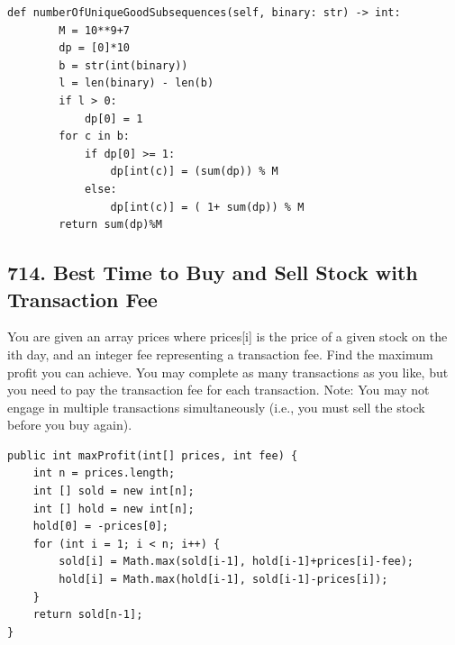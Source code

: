 \documentclass[9pt, b5paaper]{book}
\begin{document}
\begin{verbatim}
def numberOfUniqueGoodSubsequences(self, binary: str) -> int:
        M = 10**9+7
        dp = [0]*10
        b = str(int(binary))
        l = len(binary) - len(b)
        if l > 0:
            dp[0] = 1
        for c in b:
            if dp[0] >= 1:
                dp[int(c)] = (sum(dp)) % M
            else:
                dp[int(c)] = ( 1+ sum(dp)) % M
        return sum(dp)%M
\end{verbatim}
\subsection{714. Best Time to Buy and Sell Stock with Transaction Fee}
\label{sec-1-4-21}
You are given an array prices where prices[i] is the price of a given stock on the ith day, and an integer fee representing a transaction fee.
Find the maximum profit you can achieve. You may complete as many transactions as you like, but you need to pay the transaction fee for each transaction.
Note: You may not engage in multiple transactions simultaneously (i.e., you must sell the stock before you buy again).
\begin{verbatim}
public int maxProfit(int[] prices, int fee) {
    int n = prices.length;
    int [] sold = new int[n];
    int [] hold = new int[n];
    hold[0] = -prices[0];
    for (int i = 1; i < n; i++) {
        sold[i] = Math.max(sold[i-1], hold[i-1]+prices[i]-fee);
        hold[i] = Math.max(hold[i-1], sold[i-1]-prices[i]);
    }
    return sold[n-1];
}
\end{verbatim}
\end{document}
